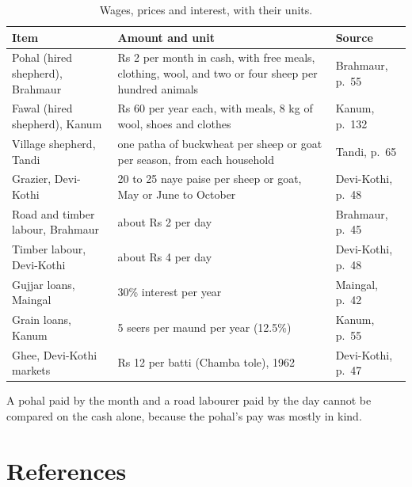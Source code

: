 \documentclass[11pt,a4paper]{article}
\begin{document}
\begin{table}[h]\centering\small
\caption{Wages, prices and interest, with their units.}\label{tab:wages}
\begin{tabularx}{\textwidth}{lYl}\toprule
Item & Amount and unit & Source\\\midrule
Pohal (hired shepherd), Brahmaur & Rs 2 per month in cash, with free meals, clothing, wool, and two or four sheep per hundred animals & Brahmaur, p.~55\\
Fawal (hired shepherd), Kanum & Rs 60 per year each, with meals, 8 kg of wool, shoes and clothes & Kanum, p.~132\\
Village shepherd, Tandi & one patha of buckwheat per sheep or goat per season, from each household & Tandi, p.~65\\
Grazier, Devi-Kothi & 20 to 25 naye paise per sheep or goat, May or June to October & Devi-Kothi, p.~48\\
Road and timber labour, Brahmaur & about Rs 2 per day & Brahmaur, p.~45\\
Timber labour, Devi-Kothi & about Rs 4 per day & Devi-Kothi, p.~48\\
Gujjar loans, Maingal & 30\% interest per year & Maingal, p.~42\\
Grain loans, Kanum & 5 seers per maund per year (12.5\%) & Kanum, p.~55\\
Ghee, Devi-Kothi markets & Rs 12 per batti (Chamba tole), 1962 & Devi-Kothi, p.~47\\
\bottomrule\end{tabularx}

\smallskip
A pohal paid by the month and a road labourer paid by the day cannot be
compared on the cash alone, because the pohal's pay was mostly in kind.
\end{table}

\clearpage
\section{References}
\end{document}
